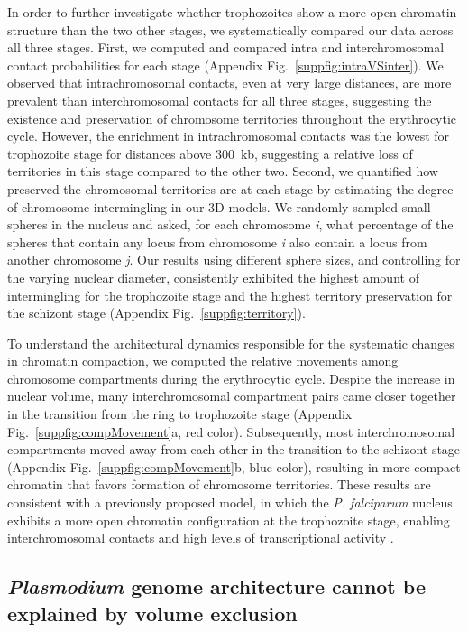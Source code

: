 In order to further investigate whether trophozoites show a more open
chromatin structure than the two other stages, we systematically compared our
data across all three stages. First, we computed and compared intra and
interchromosomal contact probabilities for each stage (Appendix
Fig.~\ref{suppfig:intraVSinter}). We observed that intrachromosomal contacts,
even at very large distances, are more prevalent than interchromosomal
contacts for all three stages, suggesting the existence and preservation of
chromosome territories throughout the erythrocytic cycle. However, the
enrichment in intrachromosomal contacts was the lowest for trophozoite stage
for distances above 300~kb, suggesting a relative loss of territories in this
stage compared to the other two. Second, we quantified how preserved the
chromosomal territories are at each stage by estimating the degree of
chromosome intermingling in our 3D models. We randomly sampled small spheres
in the nucleus and asked, for each chromosome {\em i}, what percentage of the
spheres that contain any locus from chromosome {\em i} also contain a locus
from another chromosome {\em j}. Our results using different sphere sizes, and
controlling for the varying nuclear diameter, consistently exhibited the
highest amount of intermingling for the trophozoite stage and the highest
territory preservation for the schizont stage (Appendix
Fig.~\ref{suppfig:territory}).

To understand the architectural dynamics responsible for the systematic
changes in chromatin compaction, we computed the relative movements among
chromosome compartments during the erythrocytic cycle. Despite the increase in
nuclear volume, many interchromosomal compartment pairs came closer together
in the transition from the ring to trophozoite stage (Appendix
Fig.~\ref{suppfig:compMovement}a, red color). Subsequently, most
interchromosomal compartments moved away from each other in the transition to
the schizont stage (Appendix Fig.~\ref{suppfig:compMovement}b, blue
color), resulting in more compact chromatin that favors formation of
chromosome territories. These results are consistent with a previously
proposed model, in which the {\em P. falciparum} nucleus exhibits a more open
chromatin configuration at the trophozoite stage, enabling interchromosomal
contacts and high levels of transcriptional activity \citep{ponts:nucleosome}.

\subsection{{\em Plasmodium} genome architecture cannot be explained by volume exclusion}


